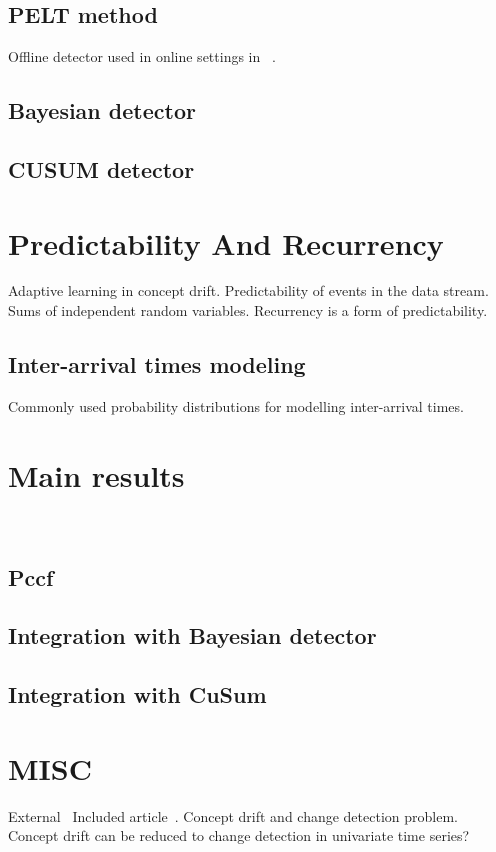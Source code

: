 \documentclass[licentiate,utf8,lot,loar,lof,shortloft,index]{jydiss}
\begin{document}
\section{PELT method}
Offline detector used in online settings in ~\cite{marrero2013aclac}.
~\cite{killick2012optimal}

\section{Bayesian detector}
\cite{adams2007bayesian}

\section{CUSUM detector}

\chapter{Predictability And Recurrency}
Adaptive learning in concept drift.
Predictability of events in the data stream.
~\cite{feller2008introduction}
Sums of independent random variables.
Recurrency is a form of predictability.

\section{Inter-arrival times modeling}
Commonly used probability distributions for modelling inter-arrival times.


\chapter{Main results}
~\cite{MaslovSDM2016, MaslovIJCNN2017}
\section{Pccf}
\section{Integration with Bayesian detector}
\section{Integration with CuSum}

\chapter{MISC}
External~\cite{shewhart1931economic}
Included article~\cite{sha1}.
Concept drift and change detection problem.
Concept drift can be reduced to change detection in univariate time series?
\end{document}

